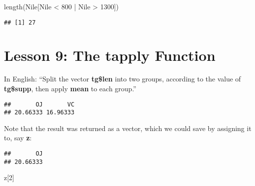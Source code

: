 \documentclass[
]{article}
\newenvironment{Shaded}{\begin{snugshade}}{\end{snugshade}}
\newcommand{\DecValTok}[1]{\textcolor[rgb]{0.00,0.00,0.81}{#1}}
\newcommand{\FunctionTok}[1]{\textcolor[rgb]{0.00,0.00,0.00}{#1}}
\newcommand{\NormalTok}[1]{#1}
\newcommand{\OtherTok}[1]{\textcolor[rgb]{0.56,0.35,0.01}{#1}}
\newcommand{\SpecialCharTok}[1]{\textcolor[rgb]{0.00,0.00,0.00}{#1}}
\begin{document}
\begin{Shaded}
\begin{Highlighting}[]
\FunctionTok{length}\NormalTok{(Nile[Nile }\SpecialCharTok{\textless{}} \DecValTok{800} \SpecialCharTok{|}\NormalTok{ Nile }\SpecialCharTok{\textgreater{}} \DecValTok{1300}\NormalTok{])}
\end{Highlighting}
\end{Shaded}

\begin{verbatim}
## [1] 27
\end{verbatim}

\hypertarget{lesson-9-the-tapply-function}{%
\section{Lesson 9: The tapply
Function}\label{lesson-9-the-tapply-function}}

In English: ``Split the vector \textbf{tg\$len} into two groups,
according to the value of \textbf{tg\$supp}, then apply \textbf{mean} to
each group.''

\begin{Shaded}
\end{Shaded}

\begin{verbatim}
##       OJ       VC 
## 20.66333 16.96333
\end{verbatim}

Note that the result was returned as a vector, which we could save by
assigning it to, say \textbf{z}:

\begin{Shaded}
\end{Shaded}

\begin{verbatim}
##       OJ 
## 20.66333
\end{verbatim}

\begin{Shaded}
\begin{Highlighting}[]
\NormalTok{z[}\DecValTok{2}\NormalTok{]}
\end{Highlighting}
\end{Shaded}
\end{document}
